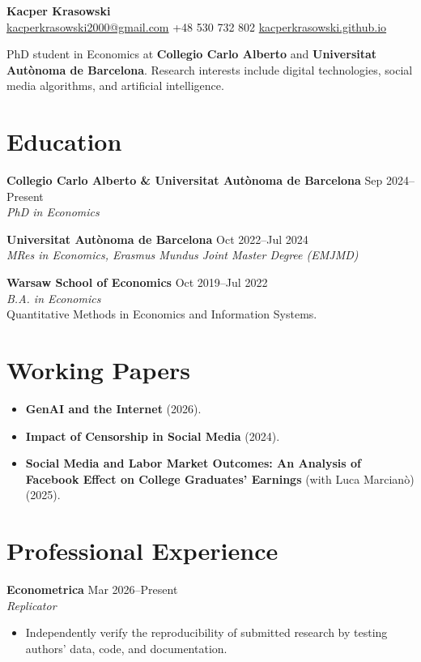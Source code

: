 \documentclass[11pt,letterpaper]{article}
\newcommand{\entry}[4]{%
    \textbf{#1} \hfill #2\\
    \textit{#3}\\
    #4
    \vspace{0.6em}
}
\begin{document}
{\LARGE\textbf{Kacper Krasowski}}\\[0.4em]
\href{mailto:kacperkrasowski2000@gmail.com}{kacperkrasowski2000@gmail.com}
\textbar{} +48 530 732 802
\textbar{} \href{https://kacperkrasowski.github.io/}{kacperkrasowski.github.io}

\vspace{0.8em}
PhD student in Economics at \textbf{Collegio Carlo Alberto} and \textbf{Universitat Aut\`onoma de Barcelona}. Research interests include digital technologies, social media algorithms, and artificial intelligence.

\section*{Education}

\entry{Collegio Carlo Alberto \& Universitat Aut\`onoma de Barcelona}{Sep 2024--Present}{PhD in Economics}{}

\entry{Universitat Aut\`onoma de Barcelona}{Oct 2022--Jul 2024}{MRes in Economics, Erasmus Mundus Joint Master Degree (EMJMD)}{}

\entry{Warsaw School of Economics}{Oct 2019--Jul 2022}{B.A. in Economics}{Quantitative Methods in Economics and Information Systems.}

\section*{Working Papers}

\begin{itemize}
    \item \textbf{GenAI and the Internet} (2026).
    \item \textbf{Impact of Censorship in Social Media} (2024).
    \item \textbf{Social Media and Labor Market Outcomes: An Analysis of Facebook Effect on College Graduates' Earnings} (with Luca Marcian\`o) (2025).
\end{itemize}

\section*{Professional Experience}

\entry{Econometrica}{Mar 2026--Present}{Replicator}{
\begin{itemize}
    \item Independently verify the reproducibility of submitted research by testing authors' data, code, and documentation.
\end{itemize}
}
\end{document}
